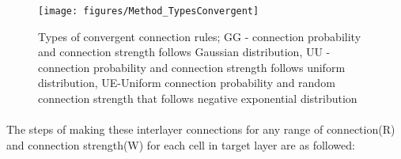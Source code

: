 \begin{figure}[!h]
	\centering
	\texttt{[image: figures/Method\_TypesConvergent]}
	\caption{Types of convergent connection rules; GG - connection probability and connection strength follows Gaussian distribution, UU - connection probability and connection strength follows uniform distribution, UE-Uniform connection probability and random connection strength that follows negative exponential distribution }
	\label{fig:ConvergentRule}
\end{figure} 

\paragraph{} The steps of making these interlayer connections for any range of connection(R) and connection strength(W) for each cell in target layer are as followed: 

